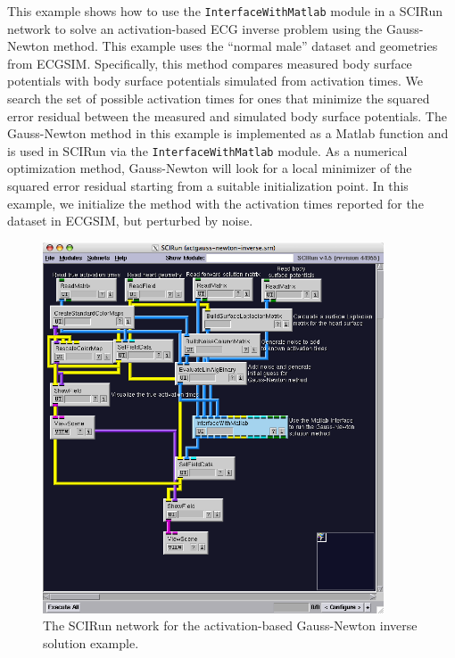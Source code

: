 This example shows how to use the {\tt InterfaceWithMatlab} module in a SCIRun network to solve an activation-based ECG inverse problem using the Gauss-Newton method. This example uses the ``normal male'' dataset and geometries from ECGSIM. Specifically, this method compares measured body surface potentials with body surface potentials simulated from activation times. We search the set of possible activation times for ones that minimize the squared error residual between the measured and simulated body surface potentials. The Gauss-Newton method in this example is implemented as a Matlab function and is used in SCIRun via the {\tt InterfaceWithMatlab} module. As a numerical optimization method, Gauss-Newton will look for a local minimizer of the squared error residual starting from a suitable initialization point. In this example, we initialize the method with the activation times reported for the dataset in ECGSIM, but perturbed by noise.

\begin{figure}[H]
\begin{center}
\includegraphics[width=0.9\textwidth]{ECGToolkitGuide_figures/actgaussnewtonnetwork.png}
\caption{The SCIRun network for the activation-based Gauss-Newton inverse solution example.}
\label{GaussNewtonNetworkExample}
\end{center}
\end{figure}

